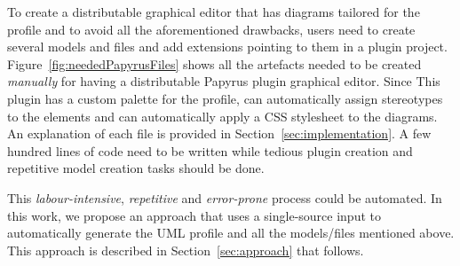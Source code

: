 To create a distributable graphical editor that has diagrams tailored for the profile and to avoid all the aforementioned drawbacks, users need to create several models and files and add extensions pointing to them in a plugin project. 
Figure~\ref{fig:neededPapyrusFiles} shows all the artefacts needed to be created \textit{manually} for having a distributable Papyrus plugin graphical editor. Since 
This plugin has a custom palette for the profile, can automatically assign stereotypes to the elements and can automatically apply a CSS stylesheet to the diagrams.
An explanation of each file is provided in Section~\ref{sec:implementation}. 
A few hundred lines of code need to be written while tedious plugin creation and repetitive model creation tasks should be done. 


This \textit{labour-intensive}, \textit{repetitive} and \textit{error-prone} process could be automated. 
In this work, we propose an approach that uses a single-source input to automatically generate the UML profile and all the models/files mentioned above. 
This approach is described in Section~\ref{sec:approach} that follows. 

